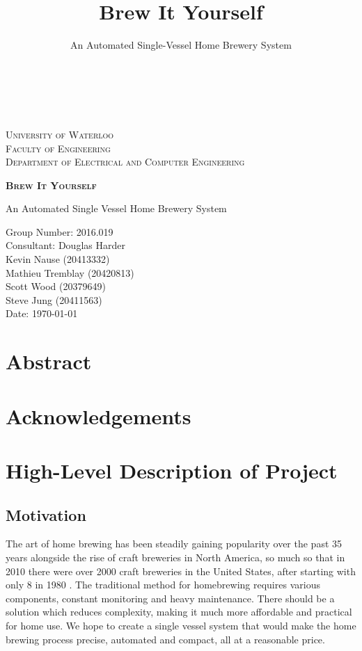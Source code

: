\documentclass{article}
\author{\\\\}
\title{Brew It Yourself}
\subtitle{An Automated Single-Vessel Home Brewery System}
\begin{document}
\begin{titlepage}
    \begin{center}
        \vspace*{1cm}
        
        \textsc{\LARGE University of Waterloo}\\ [0.1cm]
        \textsc{\Large Faculty of Engineering}\\
        \textsc{Department of Electrical and Computer Engineering}

		\vspace{4.5cm}

        \textsc{\Huge \textbf{Brew It Yourself}}
        
        \vspace{0.2cm}
        An Automated Single Vessel Home Brewery System
                
        \vfill
        
        Group Number: 2016.019
		\\Consultant: Douglas Harder
        \vspace{0.5cm}
        \\Kevin Nause (20413332) 
        \\Mathieu Tremblay (20420813) 
        \\Scott Wood (20379649) 
        \\Steve Jung (20411563) 
        \vspace{0.5cm}
        \\Date: \today
        \vspace{3.0cm}
    \end{center}
\end{titlepage}

\justify
\onehalfspacing

\pagebreak
\section*{Abstract}
\section*{Acknowledgements}
\tableofcontents
\listoffigures
\listoftables
\pagebreak

\setcounter{section}{0}
\section{High-Level Description of Project}
\subsection{Motivation}
The art of home brewing has been steadily gaining popularity over the past 35 years alongside the rise of craft breweries in North America, so much so that in 2010 there were over 2000 craft breweries in the United States, after starting with only 8 in 1980 \cite{craft-beer}. The traditional method for homebrewing requires various components, constant monitoring and heavy maintenance. There should be a solution which reduces complexity, making it much more affordable and practical for home use. We hope to create a single vessel system that would make the home brewing process precise, automated and compact, all at a reasonable price.
\end{document}
